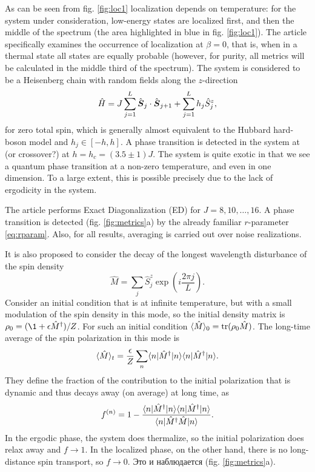 As can be seen from fig. \ref{fig:loc1} localization depends on temperature: for the system under consideration, low-energy states are localized first, and then the middle of the spectrum (the area highlighted in blue in fig. \ref{fig:loc1}). The article \cite{pal_many-body_2010} specifically examines the occurrence of localization at $\beta=0$, that is, when in a thermal state all states are equally probable (however, for purity, all metrics will be calculated in the middle third of the spectrum). The system is considered to be a Heisenberg chain with random fields along the $z$-direction
\begin{equation*}
\hat{H} = J \sum_{j=1}^L \hat{\boldsymbol{S}}_j \cdot \hat{\boldsymbol{S}}_{j+1} + \sum_{j=1 }^L h_j \hat{S}_j^z,
\end{equation*}
for zero total spin, which is generally almost equivalent to the Hubbard hard-boson model and $h_j \in [-h,h]$. A phase transition is detected in the system at (or crossover?) at $h = h_c = \left(3.5 \pm 1\right)J$. The system is quite exotic in that we see a quantum phase transition at a non-zero temperature, and even in one dimension. To a large extent, this is possible precisely due to the lack of ergodicity in the system. 

The article performs Exact Diagonalization (ED) for $J=8,10,\ldots,16$. A phase transition is detected (fig. \ref{fig:metrics}a) by the already familiar $r$-parameter \eqref{eq:rparam}. Also, for all results, averaging is carried out over noise realizations.

It is also proposed to consider the decay of the longest wavelength disturbance of the spin density
\begin{equation*}
	\hat{M} = \sum_j \hat{S}_j^z \exp\left(i \frac{2\pi j}{L}\right).
\end{equation*}
Consider an initial condition that is at infinite temperature, but with a small modulation of the spin density in this mode, so the initial density matrix is $\rho_0 = (\1 + \epsilon \hat{M}\D) / Z$. For such an initial condition $\langle \hat{M}\rangle_0 = \mathop{\mathrm{tr}}\nolimits (\rho_0 \hat{M})$. The long-time average of the spin polarization in this mode is
\begin{equation*}
	\langle \hat{M}\rangle_t = \frac{\epsilon}{Z} \sum_n \bk{n}[\hat{M}\D]{n} \bk{n}[\hat{M}\D]{n}.
\end{equation*}
They define the fraction of the contribution to the initial polarization that is dynamic and thus decays away (on average) at long time, as
\begin{equation*}
	f^{(n)} = 1 - \frac{\bk{n}[\hat{M}\D]{n} \bk{n}[\hat{M}\D]{n}}{\bk{n}[\hat{M}\D \hat{M}]{n} }.
\end{equation*}
In the ergodic phase, the system does thermalize, so the initial polarization does relax away and $f \to 1$. In the localized phase, on the other hand, there is no long-distance spin transport, so $f \to 0$. Это и наблюдается (fig. \ref{fig:metrics}a).


